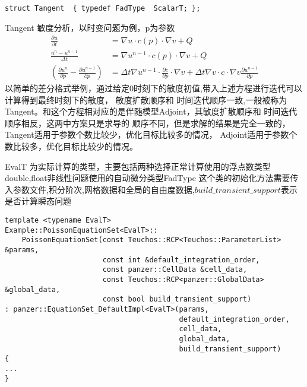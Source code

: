\begin{lstlisting}
struct Tangent  { typedef FadType  ScalarT; };
\end{lstlisting}
Tangent 敏度分析，以时变问题为例，p为参数
\[
\begin{aligned}
\frac{\partial u}{\partial t} &= \nabla u\cdot c(p)\cdot \nabla v + Q\\
\frac{u^n-u^{n-1}}{\Delta t} &= \nabla u^{n-1}\cdot c(p)\cdot \nabla v + Q\\
(\frac{\partial u^n}{\partial p} - \frac{\partial u^{n-1}}{\partial p})&= 
\Delta t\nabla u^{n-1} \cdot\frac{\partial c}{\partial p} \cdot\nabla v +
\Delta t \nabla v \cdot c \cdot \nabla v \frac{\partial u^{n-1}}{\partial p}
\end{aligned}
\]
以简单的差分格式举例，通过给定0时刻下的敏度初值,带入上述方程进行迭代可以计算得到最终时刻下的敏度，
敏度扩散顺序和
时间迭代顺序一致,一般被称为Tangent。和这个方程相对应的是伴随模型Adjoint，其敏度扩散顺序和
时间迭代顺序相反，这两中方案只是求导的
顺序不同，但是求解的结果是完全一致的，Tangent适用于参数个数比较少，优化目标比较多的情况，
Adjoint适用于参数个数比较多，优化目标比较少的情况。

EvalT 为实际计算的类型，主要包括两种选择正常计算使用的浮点数类型double,float非线性问题使用的自动微分类型FadType
这个类的初始化方法需要传入参数文件,积分阶次,网格数据和全局的自由度数据,$build\_transient\_support$表示
是否计算瞬态问题
\begin{lstlisting}
template <typename EvalT>
Example::PoissonEquationSet<EvalT>::
    PoissonEquationSet(const Teuchos::RCP<Teuchos::ParameterList> &params,
                       const int &default_integration_order,
                       const panzer::CellData &cell_data,
                       const Teuchos::RCP<panzer::GlobalData> &global_data,
                       const bool build_transient_support)
: panzer::EquationSet_DefaultImpl<EvalT>(params, 
                                         default_integration_order, 
                                         cell_data, 
                                         global_data, 
                                         build_transient_support)
{
...
}
\end{lstlisting}

